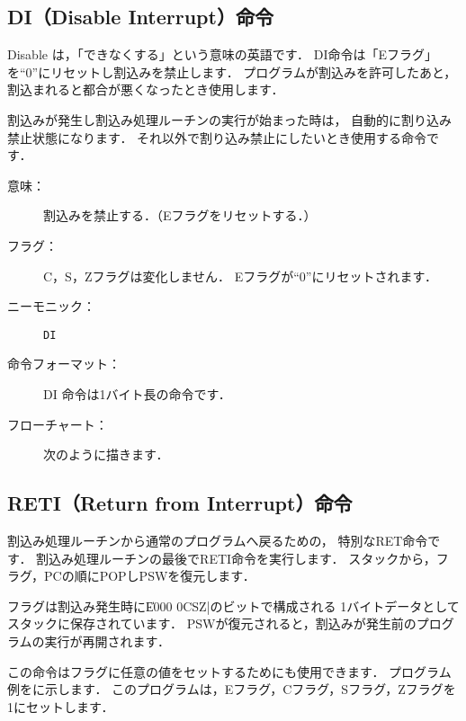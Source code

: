 \subsection{DI（Disable Interrupt）命令}

Disable は，「できなくする」という意味の英語です．
DI命令は「Eフラグ」を``0''にリセットし割込みを禁止します．
プログラムが割込みを許可したあと，
割込まれると都合が悪くなったとき使用します．

割込みが発生し割込み処理ルーチンの実行が始まった時は，
自動的に割り込み禁止状態になります．
それ以外で割り込み禁止にしたいとき使用する命令です．

\begin{description}
\item[意味：]割込みを禁止する．（Eフラグをリセットする．）

\item[フラグ：]C，S，Zフラグは変化しません．
Eフラグが``0''にリセットされます．

\item[ニーモニック：] {\tt DI}

\item[命令フォーマット：]DI 命令は1バイト長の命令です．


\item[フローチャート：]
次のように描きます．

\begin{center}
\end{center}

\end{description}

\subsection{RETI（Return from Interrupt）命令}

割込み処理ルーチンから通常のプログラムへ戻るための，
特別なRET命令です．
割込み処理ルーチンの最後でRETI命令を実行します．
スタックから，フラグ，PCの順にPOPしPSWを復元します．

フラグは割込み発生時に\|E000 0CSZ|のビットで構成される
1バイトデータとしてスタックに保存されています．
PSWが復元されると，割込みが発生前のプログラムの実行が再開されます．

この命令はフラグに任意の値をセットするためにも使用できます．
プログラム例をに示します．
このプログラムは，Eフラグ，Cフラグ，Sフラグ，Zフラグを1にセットします．

